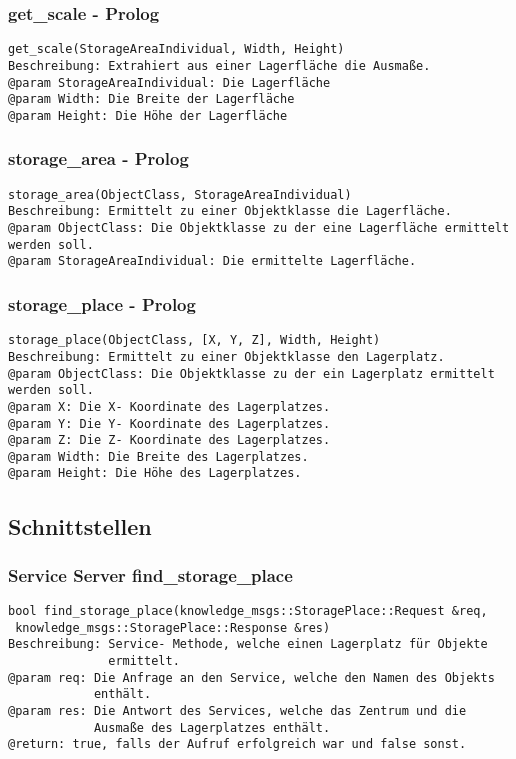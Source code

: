 \documentclass{suturo}
\begin{document}
\subsubsection{get\_scale - Prolog}
\begin{verbatim}
get_scale(StorageAreaIndividual, Width, Height)
Beschreibung: Extrahiert aus einer Lagerfläche die Ausmaße.
@param StorageAreaIndividual: Die Lagerfläche
@param Width: Die Breite der Lagerfläche
@param Height: Die Höhe der Lagerfläche
\end{verbatim}\label{func:estimatesurfacenormals}

\subsubsection{storage\_area - Prolog}
\begin{verbatim}
storage_area(ObjectClass, StorageAreaIndividual)
Beschreibung: Ermittelt zu einer Objektklasse die Lagerfläche.
@param ObjectClass: Die Objektklasse zu der eine Lagerfläche ermittelt werden soll.
@param StorageAreaIndividual: Die ermittelte Lagerfläche.
\end{verbatim}\label{func:apply3dfilter}

\subsubsection{storage\_place - Prolog}
\begin{verbatim}
storage_place(ObjectClass, [X, Y, Z], Width, Height)
Beschreibung: Ermittelt zu einer Objektklasse den Lagerplatz.
@param ObjectClass: Die Objektklasse zu der ein Lagerplatz ermittelt werden soll.
@param X: Die X- Koordinate des Lagerplatzes.
@param Y: Die Y- Koordinate des Lagerplatzes.
@param Z: Die Z- Koordinate des Lagerplatzes.
@param Width: Die Breite des Lagerplatzes.
@param Height: Die Höhe des Lagerplatzes.
\end{verbatim}\label{func:estimateplaneindices}

\subsection{Schnittstellen}

\subsubsection{Service Server find\_storage\_place}
\begin{verbatim}
bool find_storage_place(knowledge_msgs::StoragePlace::Request &req,
 knowledge_msgs::StoragePlace::Response &res)
Beschreibung: Service- Methode, welche einen Lagerplatz für Objekte 
              ermittelt.
@param req: Die Anfrage an den Service, welche den Namen des Objekts 
            enthält.  
@param res: Die Antwort des Services, welche das Zentrum und die 
            Ausmaße des Lagerplatzes enthält.
@return: true, falls der Aufruf erfolgreich war und false sonst.
\end{verbatim}\label{func:findcluster}
\end{document}
